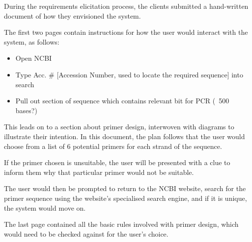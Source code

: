 During the requirements elicitation process, the clients submitted a
hand-written document of how they envisioned the system. 

The first two pages contain instructions for how the user would
interact with the system, as follows:

\begin{itemize}
\item{Open NCBI}
\item{Type Acc. \# [Accession Number, used to locate the required
    sequence] into search}
\item{Pull out section of sequence which contains relevant bit for PCR
    (~500 bases?)}
\end{itemize}

This leads on to a section about primer design, interwoven with
diagrams to illustrate their intention. In this document, the plan
follows that the user would choose from a list of 6 potential primers
for each strand of the sequence. 

If the primer chosen is unsuitable, the user will be presented with a
clue to inform them why that particular primer would not be suitable.

The user would then be prompted to return to the NCBI website, search
for the primer sequence using the website's specialised search engine,
and if it is unique, the system would move on. 

The last page contained all the basic rules involved with primer
design, which would need to be checked against for the user's choice.
